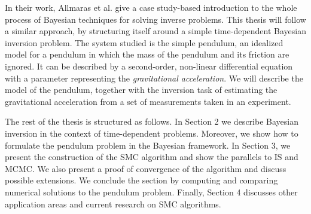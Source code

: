 In their work, Allmaras et al. \cite{bayes-tutorial} give a case study-based introduction to the whole process of Bayesian techniques for solving inverse problems. This thesis will follow a similar approach, by structuring itself around a simple time-dependent Bayesian inversion problem. The system studied is the simple pendulum, an idealized model for a pendulum in which the mass of the pendulum and its friction are ignored. It can be described by a second-order, non-linear differential equation with a parameter representing the \textit{gravitational acceleration}. We will describe the model of the pendulum, together with the inversion task of estimating the gravitational acceleration from a set of measurements taken in an experiment. 


The rest of the thesis is structured as follows. In Section 2 we describe Bayesian inversion in the context of time-dependent problems. Moreover, we show how to formulate the pendulum problem in the Bayesian framework. In Section 3, we present the construction of the SMC algorithm and show the parallels to IS and MCMC. We also present a proof of convergence of the algorithm and discuss possible extensions. We conclude the section by computing and comparing numerical solutions to the pendulum problem. Finally, Section 4 discusses other application areas and current research on SMC algorithms.

